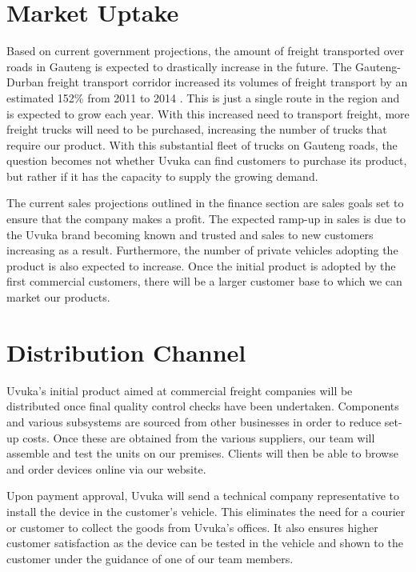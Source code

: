 \section{Market Uptake}

Based on current government projections, the amount of freight transported over roads in Gauteng is expected to drastically increase in the future. The Gauteng-Durban freight transport corridor increased its volumes of freight transport by an estimated 152\% from 2011 to 2014 \cite{freighttransport}. This is just a single route in the region and is expected to grow each year. With this increased need to transport freight, more freight trucks will need to be purchased, increasing the number of trucks that require our product. With this substantial fleet of trucks on Gauteng roads, the question becomes not whether Uvuka can find customers to purchase its product, but rather if it has the capacity to supply the growing demand.

\pagebreak

The current sales projections outlined in the finance section are sales goals set to ensure that the company makes a profit. The expected ramp-up in sales is due to the Uvuka brand becoming known and trusted and sales to new customers increasing as a result. Furthermore, the number of private vehicles adopting the product is also expected to increase. Once the initial product is adopted by the first commercial customers, there will be a larger customer base to which we can market our products.

\section{Distribution Channel}
Uvuka's initial product aimed at commercial freight companies will be distributed once final quality control checks have been undertaken. Components and various subsystems are sourced from other businesses in order to reduce set-up costs. Once these are obtained from the various suppliers, our team will assemble and test the units on our premises. Clients will then be able to browse and order devices online via our website.

Upon payment approval, Uvuka will send a technical company representative to install the device in the customer's vehicle. This eliminates the need for a courier or customer to collect the goods from Uvuka's offices. It also ensures higher customer satisfaction as the device can be tested in the vehicle and shown to the customer under the guidance of one of our team members.

